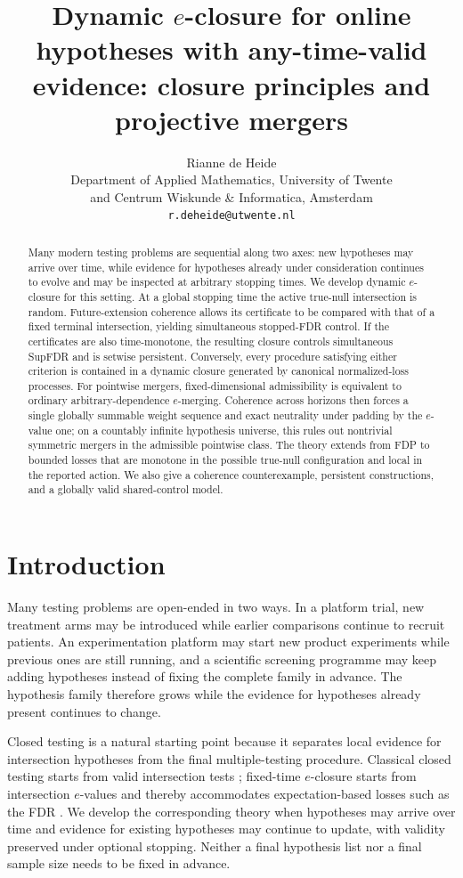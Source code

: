 \documentclass[11pt]{article}
\title{Dynamic $e$-closure for online hypotheses with any-time-valid evidence: closure principles and projective mergers}
\author{Rianne de Heide\\Department of Applied Mathematics, University of Twente\\ and Centrum Wiskunde \& Informatica, Amsterdam\\\texttt{r.deheide@utwente.nl}}
\date{}
\numberwithin{equation}{section}
\theoremstyle{plain}
\theoremstyle{definition}
\begin{document}
\maketitle
\begin{abstract}
Many modern testing problems are sequential along two axes: new hypotheses may arrive over time, while evidence for hypotheses already under consideration continues to evolve and may be inspected at arbitrary stopping times. We develop dynamic $e$-closure for this setting. At a global stopping time the active true-null intersection is random. Future-extension coherence allows its certificate to be compared with that of a fixed terminal intersection, yielding simultaneous stopped-FDR control. If the certificates are also time-monotone, the resulting closure controls simultaneous SupFDR and is setwise persistent. Conversely, every procedure satisfying either criterion is contained in a dynamic closure generated by canonical normalized-loss processes. For pointwise mergers, fixed-dimensional admissibility is equivalent to ordinary arbitrary-dependence $e$-merging. Coherence across horizons then forces a single globally summable weight sequence and exact neutrality under padding by the $e$-value one; on a countably infinite hypothesis universe, this rules out nontrivial symmetric mergers in the admissible pointwise class. The theory extends from FDP to bounded losses that are monotone in the possible true-null configuration and local in the reported action. We also give a coherence counterexample, persistent constructions, and a globally valid shared-control model.
\end{abstract}
\tableofcontents
\newpage
\section{Introduction}\label{sec:intro}

Many testing problems are open-ended in two ways. In a platform trial, new treatment arms may be introduced while earlier comparisons continue to recruit patients. An experimentation platform may start new product experiments while previous ones are still running, and a scientific screening programme may keep adding hypotheses instead of fixing the complete family in advance. The hypothesis family therefore grows while the evidence for hypotheses already present continues to change.

Closed testing is a natural starting point because it separates local evidence for intersection hypotheses from the final multiple-testing procedure. Classical closed testing starts from valid intersection tests \citep{MarcusPeritzGabriel1976}; fixed-time $e$-closure starts from intersection $e$-values and thereby accommodates expectation-based losses such as the FDR \citep{XuEtAl2026Closure}. We develop the corresponding theory when hypotheses may arrive over time and evidence for existing hypotheses may continue to update, with validity preserved under optional stopping. Neither a final hypothesis list nor a final sample size needs to be fixed in advance.
\end{document}
